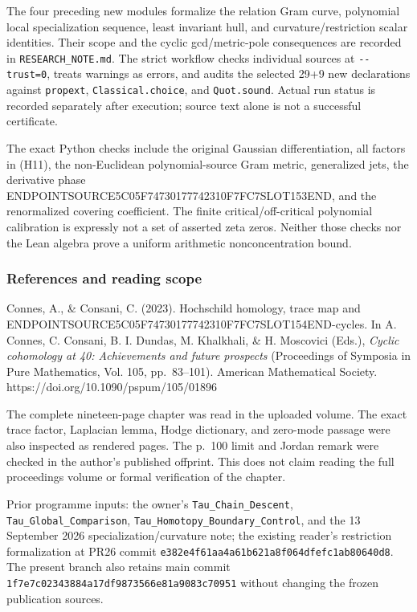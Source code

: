 The four preceding new modules formalize the relation Gram curve, polynomial local specialization sequence, least invariant hull, and curvature/restriction scalar identities. Their scope and the cyclic gcd/metric-pole consequences are recorded in \texttt{RESEARCH\_NOTE.md}. The strict workflow checks individual sources at \texttt{-\/-trust=0}, treats warnings as errors, and audits the selected 29+9 new declarations against \texttt{propext}, \texttt{Classical.choice}, and \texttt{Quot.sound}. Actual run status is recorded separately after execution; source text alone is not a successful certificate.

The exact Python checks include the original Gaussian differentiation, all factors in (H11), the non-Euclidean polynomial-source Gram metric, generalized jets, the derivative phase ENDPOINTSOURCE5C05F74730177742310F7FC7SLOT153END, and the renormalized covering coefficient. The finite critical/off-critical polynomial calibration is expressly not a set of asserted zeta zeros. Neither those checks nor the Lean algebra prove a uniform arithmetic nonconcentration bound.

\subsubsection{References and reading scope}\label{endpoint-cc_hochschild--references-and-reading-scope}

Connes, A., \& Consani, C. (2023). Hochschild homology, trace map and ENDPOINTSOURCE5C05F74730177742310F7FC7SLOT154END-cycles. In A. Connes, C. Consani, B. I. Dundas, M. Khalkhali, \& H. Moscovici (Eds.), \emph{Cyclic cohomology at 40: Achievements and future prospects} (Proceedings of Symposia in Pure Mathematics, Vol. 105, pp.~83--101). American Mathematical Society. https://doi.org/10.1090/pspum/105/01896

The complete nineteen-page chapter was read in the uploaded volume. The exact trace factor, Laplacian lemma, Hodge dictionary, and zero-mode passage were also inspected as rendered pages. The p.~100 limit and Jordan remark were checked in the author's published offprint. This does not claim reading the full proceedings volume or formal verification of the chapter.

Prior programme inputs: the owner's \texttt{Tau\_Chain\_Descent}, \texttt{Tau\_Global\_Comparison}, \texttt{Tau\_Homotopy\_Boundary\_Control}, and the 13 September 2026 specialization/curvature note; the existing reader's restriction formalization at PR26 commit \texttt{e382e4f61aa4a61b621a8f064dfefc1ab80640d8}. The present branch also retains main commit \texttt{1f7e7c02343884a17df9873566e81a9083c70951} without changing the frozen publication sources.
